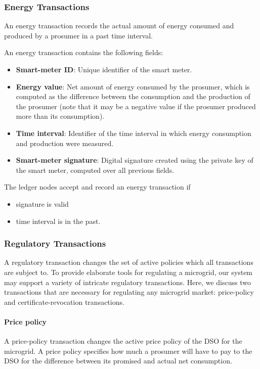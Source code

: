 \documentclass[sigconf]{acmart}
\begin{document}
\subsubsection{Energy Transactions}
An energy transaction records the actual amount of energy consumed and produced by a prosumer in a past time interval.

An energy transaction contains the following fields:
\begin{itemize}
\item \textbf{Smart-meter ID}: Unique identifier of the smart meter.
\item \textbf{Energy value}: Net amount of energy consumed by the prosumer, which is computed as the difference between the consumption and the production of the prosumer (note that it may be a negative value if the prosumer produced more than its consumption).
\item \textbf{Time interval}: Identifier of the time interval in which energy consumption and production were measured.
\item \textbf{Smart-meter signature}: Digital signature created using the private key of the smart meter, computed over all previous fields.
\end{itemize}

The ledger nodes accept and record an energy transaction if
\begin{itemize}
\item signature is valid
\item time interval is in the past.
\end{itemize}

\subsubsection{Regulatory Transactions}
A regulatory transaction changes the set of active policies which all transactions are subject to.
To provide elaborate tools for regulating a microgrid, our system may support a variety of intricate regulatory transactions.
Here, we discuss two transactions that are necessary for regulating any microgrid market: price-policy and certificate-revocation transactions.

\paragraph{Price policy}
A price-policy transaction changes the active price policy of the DSO for the microgrid.
A price policy specifies how much a prosumer will have to pay to the DSO for the difference between its promised and actual net consumption.
\end{document}

